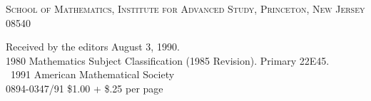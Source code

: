 \documentclass[12pt,a4paper]{article}
\theoremstyle{plain}
\theoremstyle{definition}
\theoremstyle{remark}
\begin{document}
\vspace{1em}

\begin{flushleft}
\small\textsc{School of Mathematics, Institute for Advanced Study, Princeton, New Jersey 08540}
\end{flushleft}

\vspace{2em}

\begin{flushleft}
\small Received by the editors August 3, 1990.\\
\small 1980 Mathematics Subject Classification (1985 Revision). Primary 22E45.\\
\small \textcopyright\ 1991 American Mathematical Society\\
\small 0894-0347/91 \$1.00 + \$.25 per page
\end{flushleft}
\end{document}

